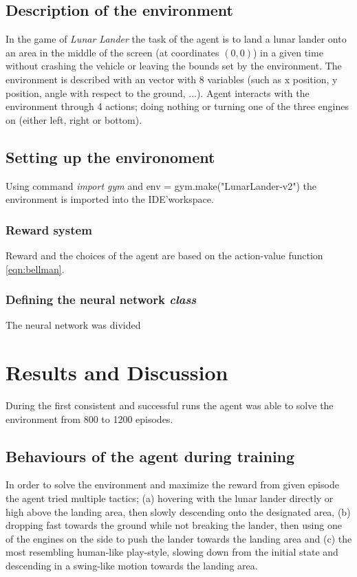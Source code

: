 \documentclass{article}
\begin{document}
\subsection{Description of the environment}
In the game of \textit{Lunar Lander} the task of the agent is to land a lunar lander onto an area in the middle of the screen (at coordinates $(0,0)$) in a given time without crashing the vehicle or leaving the bounds set by the environment. The environment is described with an vector with 8 variables (such as x position, y position, angle with respect to the ground, ...). Agent interacts with the environment through 4 actions; doing nothing or turning one of the three engines on (either left, right or bottom).

\subsection{Setting up the environoment}
Using command \textit{import gym} and env = gym.make("LunarLander-v2") the environment is imported into the IDE'\footnotemark \space workspace.

\subsubsection{Reward system}
Reward and the choices of the agent are based on the action-value function \ref{eqn:bellman}.

\subsubsection{Defining the neural network \textit{class}}
The neural network was divided

\newpage
\section*{Results and Discussion}
During the first consistent and successful runs the agent was able to solve the environment from 800 to 1200 episodes.

\subsection*{Behaviours of the agent during training}
In order to solve the environment and maximize the reward from given episode the agent tried multiple tactics; (a) hovering with the lunar lander directly or high above the landing area, then slowly descending onto the designated area, (b) dropping fast towards the ground while not breaking the lander, then using one of the engines on the side to push the lander towards the landing area and (c) the most resembling human-like play-style, slowing down from the initial state and descending in a swing-like motion towards the landing area.
\end{document}
